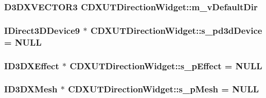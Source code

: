 \label{class_c_d_x_u_t_direction_widget_a2e519446bb939006632aeeb310ae2405}
\hypertarget{class_c_d_x_u_t_direction_widget_a856d335ef4da33a0e9e2e0eed0cf3d04}{
\subsubsection[{m\_\-vDefaultDir}]{\setlength{\rightskip}{0pt plus 5cm}D3DXVECTOR3 {\bf CDXUTDirectionWidget::m\_\-vDefaultDir}}}
\label{class_c_d_x_u_t_direction_widget_a856d335ef4da33a0e9e2e0eed0cf3d04}
\hypertarget{class_c_d_x_u_t_direction_widget_a0ee2ebc3fe9b6da8bef84030a4ccf14a}{
\subsubsection[{s\_\-pd3dDevice}]{\setlength{\rightskip}{0pt plus 5cm}IDirect3DDevice9 $\ast$ {\bf CDXUTDirectionWidget::s\_\-pd3dDevice} = NULL}}
\label{class_c_d_x_u_t_direction_widget_a0ee2ebc3fe9b6da8bef84030a4ccf14a}
\hypertarget{class_c_d_x_u_t_direction_widget_ac14ac40b7d8cc55ec2979cf77f42a448}{
\subsubsection[{s\_\-pEffect}]{\setlength{\rightskip}{0pt plus 5cm}ID3DXEffect $\ast$ {\bf CDXUTDirectionWidget::s\_\-pEffect} = NULL}}
\label{class_c_d_x_u_t_direction_widget_ac14ac40b7d8cc55ec2979cf77f42a448}
\hypertarget{class_c_d_x_u_t_direction_widget_a9d801af6502753f1d6fd4747f18f0a08}{
\subsubsection[{s\_\-pMesh}]{\setlength{\rightskip}{0pt plus 5cm}ID3DXMesh $\ast$ {\bf CDXUTDirectionWidget::s\_\-pMesh} = NULL}}
\label{class_c_d_x_u_t_direction_widget_a9d801af6502753f1d6fd4747f18f0a08}


